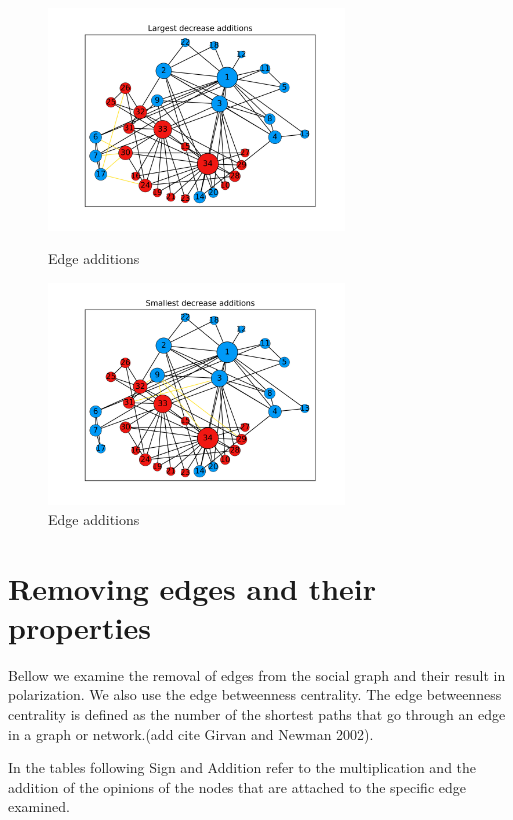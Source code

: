 \begin{figure}[!htb]
	\centering
 	\includegraphics[width=0.70\textwidth]{Figures/largest.png}
	\caption{Edge additions}
 	\label{fig:largest}
	
	\vspace{\floatsep}
	\includegraphics[width=0.70\textwidth]{Figures/smallest.png}
 	\caption{Edge additions}
 	\label{fig:smalest}
\end{figure}



\section{Removing edges and their properties}
\label{sec:properties}
Bellow we examine the removal of edges from the social graph and their result in polarization. We also use the edge betweenness centrality. The edge betweenness centrality is defined as the number of the shortest paths that go through an edge in a graph or network.(add cite Girvan and Newman 2002). 

In the tables following Sign and Addition refer to the multiplication and the addition of the opinions of the nodes that are attached to the specific edge examined.
\\

